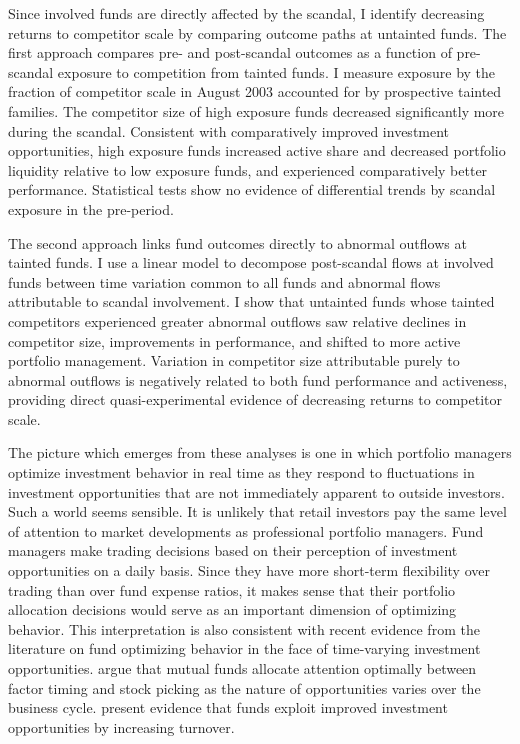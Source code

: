 \documentclass[]{book}
\theoremstyle{definition}
\theoremstyle{definition}
\theoremstyle{definition}
\theoremstyle{remark}
\begin{document}
Since involved funds are directly affected by the scandal, I identify
decreasing returns to competitor scale by comparing outcome paths at
untainted funds. The first approach compares pre- and post-scandal
outcomes as a function of pre-scandal exposure to competition from
tainted funds. I measure exposure by the fraction of competitor scale in
August 2003 accounted for by prospective tainted families. The
competitor size of high exposure funds decreased significantly more
during the scandal. Consistent with comparatively improved investment
opportunities, high exposure funds increased active share and decreased
portfolio liquidity relative to low exposure funds, and experienced
comparatively better performance. Statistical tests show no evidence of
differential trends by scandal exposure in the pre-period.

The second approach links fund outcomes directly to abnormal outflows at
tainted funds. I use a linear model to decompose post-scandal flows at
involved funds between time variation common to all funds and abnormal
flows attributable to scandal involvement. I show that untainted funds
whose tainted competitors experienced greater abnormal outflows saw
relative declines in competitor size, improvements in performance, and
shifted to more active portfolio management. Variation in competitor
size attributable purely to abnormal outflows is negatively related to
both fund performance and activeness, providing direct
quasi-experimental evidence of decreasing returns to competitor scale.

The picture which emerges from these analyses is one in which portfolio
managers optimize investment behavior in real time as they respond to
fluctuations in investment opportunities that are not immediately
apparent to outside investors. Such a world seems sensible. It is
unlikely that retail investors pay the same level of attention to market
developments as professional portfolio managers. Fund managers make
trading decisions based on their perception of investment opportunities
on a daily basis. Since they have more short-term flexibility over
trading than over fund expense ratios, it makes sense that their
portfolio allocation decisions would serve as an important dimension of
optimizing behavior. This interpretation is also consistent with recent
evidence from the literature on fund optimizing behavior in the face of
time-varying investment opportunities. \citet{knv16} argue that mutual
funds allocate attention optimally between factor timing and stock
picking as the nature of opportunities varies over the business cycle.
\citet{pst17} present evidence that funds exploit improved investment
opportunities by increasing turnover.
\end{document}
